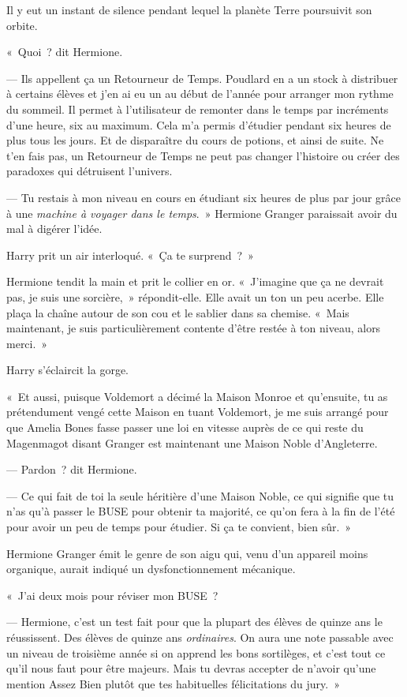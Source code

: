 Il y eut un instant de silence pendant lequel la planète Terre poursuivit son orbite.

«~Quoi~? dit Hermione.

--- Ils appellent ça un Retourneur de Temps. Poudlard en a un stock à distribuer à certains élèves et j'en ai eu un au début de l'année pour arranger mon rythme du sommeil. Il permet à l'utilisateur de remonter dans le temps par incréments d'une heure, six au maximum. Cela m'a permis d'étudier pendant six heures de plus tous les jours. Et de disparaître du cours de potions, et ainsi de suite. Ne t'en fais pas, un Retourneur de Temps ne peut pas changer l'histoire ou créer des paradoxes qui détruisent l'univers.

--- Tu restais à mon niveau en cours en étudiant six heures de plus par jour grâce à une \emph{machine à voyager dans le temps}.~» Hermione Granger paraissait avoir du mal à digérer l'idée.

Harry prit un air interloqué. «~Ça te surprend~?~»

Hermione tendit la main et prit le collier en or. «~J'imagine que ça ne devrait pas, je suis une sorcière,~» répondit-elle. Elle avait un ton un peu acerbe. Elle plaça la chaîne autour de son cou et le sablier dans sa chemise. «~Mais maintenant, je suis particulièrement contente d'être restée à ton niveau, alors merci.~»

Harry s'éclaircit la gorge.

«~Et aussi, puisque Voldemort a décimé la Maison Monroe et qu'ensuite, tu as prétendument vengé cette Maison en tuant Voldemort, je me suis arrangé pour que Amelia Bones fasse passer une loi en vitesse auprès de ce qui reste du Magenmagot disant Granger est maintenant une Maison Noble d'Angleterre.

--- Pardon~? dit Hermione.

--- Ce qui fait de toi la seule héritière d'une Maison Noble, ce qui signifie que tu n'as qu'à passer le BUSE pour obtenir ta majorité, ce qu'on fera à la fin de l'été pour avoir un peu de temps pour étudier. Si ça te convient, bien sûr.~»

Hermione Granger émit le genre de son aigu qui, venu d'un appareil moins organique, aurait indiqué un dysfonctionnement mécanique.

«~J'ai deux mois pour réviser mon BUSE~?

--- Hermione, c'est un test fait pour que la plupart des élèves de quinze ans le réussissent. Des élèves de quinze ans \emph{ordinaires}. On aura une note passable avec un niveau de troisième année si on apprend les bons sortilèges, et c'est tout ce qu'il nous faut pour être majeurs. Mais tu devras accepter de n'avoir qu'une mention Assez Bien plutôt que tes habituelles félicitations du jury.~»

